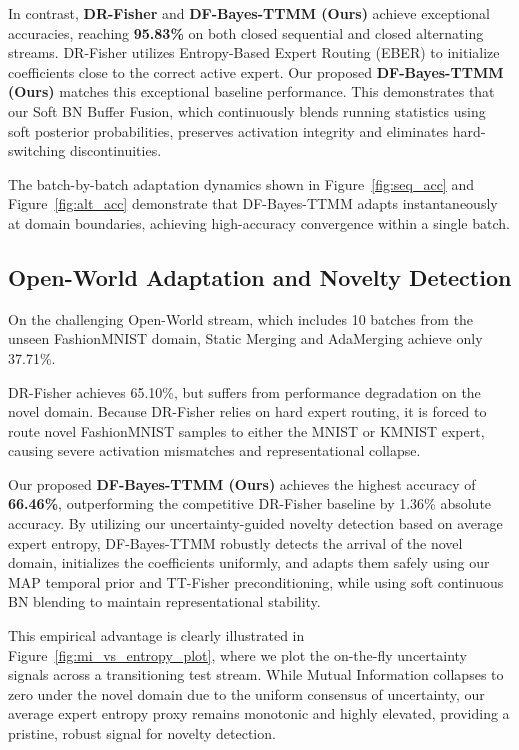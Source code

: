 \documentclass{article}
\theoremstyle{plain}
\theoremstyle{definition}
\theoremstyle{remark}
\begin{document}
In contrast, \textbf{DR-Fisher} and \textbf{DF-Bayes-TTMM (Ours)} achieve exceptional accuracies,
reaching \textbf{95.83\%} on both closed sequential and closed alternating streams. DR-Fisher
utilizes Entropy-Based Expert Routing (EBER) to initialize coefficients close to the correct active
expert.
Our proposed \textbf{DF-Bayes-TTMM (Ours)} matches this exceptional baseline performance. This
demonstrates that our Soft BN Buffer Fusion, which continuously blends running statistics using soft
posterior probabilities, preserves activation integrity and eliminates hard-switching
discontinuities.

The batch-by-batch adaptation dynamics shown in Figure~\ref{fig:seq_acc} and
Figure~\ref{fig:alt_acc} demonstrate that DF-Bayes-TTMM adapts instantaneously at domain boundaries,
achieving high-accuracy convergence within a single batch.

\subsection{Open-World Adaptation and Novelty Detection}\vspace{-0.1in}
On the challenging Open-World stream, which includes 10 batches from the unseen FashionMNIST
domain, Static Merging and AdaMerging achieve only 37.71\%.

DR-Fisher achieves 65.10\%, but suffers from performance degradation on the novel domain. Because
DR-Fisher relies on hard expert routing, it is forced to route novel FashionMNIST samples to either
the MNIST or KMNIST expert, causing severe activation mismatches and representational collapse.

Our proposed \textbf{DF-Bayes-TTMM (Ours)} achieves the highest accuracy of \textbf{66.46\%},
outperforming the competitive DR-Fisher baseline by 1.36\% absolute accuracy. By utilizing our
uncertainty-guided novelty detection based on average expert entropy, DF-Bayes-TTMM robustly detects
the arrival of the novel domain, initializes the coefficients uniformly, and adapts them safely
using our MAP temporal prior and TT-Fisher preconditioning, while using soft continuous BN blending
to maintain representational stability.

This empirical advantage is clearly illustrated in Figure~\ref{fig:mi_vs_entropy_plot}, where we
plot the on-the-fly uncertainty signals across a transitioning test stream. While Mutual Information
collapses to zero under the novel domain due to the uniform consensus of uncertainty, our average
expert entropy proxy remains monotonic and highly elevated, providing a pristine, robust signal for
novelty detection.
\end{document}
